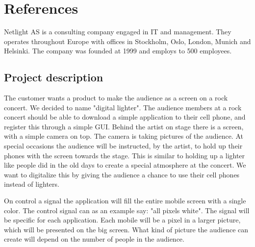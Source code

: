 \documentclass{report}
\begin{document}
\chapter*{References}
%
%
%
Netlight AS is a consulting company engaged in IT and management. They operates throughout Europe with offices in Stockholm, Oslo, London, Munich and Helsinki. The company was founded at 1999 and employs to 500 employees.

\section{Project description}
The customer wants a product to make the audience as a screen on a rock concert. We decided to name "digital lighter". 
The audience members at a rock concert should be able to download a simple application to their cell phone, and register this through a simple GUI.
Behind the artist on stage there is a screen, with a simple camera on top. The camera is taking pictures of the audience. 
At special occasions the audience will be instructed, by the artist, to hold up their phones with the screen towards the stage.
This is similar to holding up a lighter like people did in the old days to create a special atmosphere at the concert. 
We want to digitalize this by giving the audience a chance to use their cell phones instead of lighters. 

On control a signal the application will fill the entire mobile screen with a single color.
The control signal can as an example say: "all pixels white". The signal will be specific for each application.
Each mobile will be a pixel in a larger picture, which will be presented on the big screen. 
What kind of picture the audience can create will depend on the number of people in the audience.   
\end{document}
